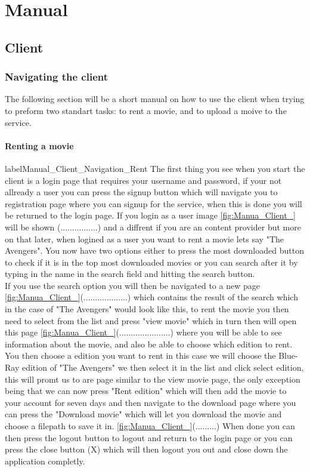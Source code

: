 \chapter{Manual}
\label{Manual}

\section{Client}
\label{Manual_Client}

\subsection{Navigating the client}
\label{Manual_Client_Navigation}
The following section will be a short manual on how to use the client when trying to preform two standart tasks: to rent a movie, and to upload a moive to the service.

\subsubsection{Renting a movie}
label{Manual_Client_Navigation_Rent}
The first thing you see when you start the client is a login page that requires your username and password, if your not allready a user you can press the signup button which will navigate you to registration page where you can signup for the service, when this is done you will be returned to the login page. If you login as a user image \ref{fig:Manua_Client_} will be shown (................) and a diffrent if you are an content provider but more on that later, when logined as a user you want to rent a movie lets say "The Avengers". You now have two options either to press the most downloaded button to check if it is in the top most downloaded movies or you can search after it by typing in the name in the search field and hitting the search button.
\\If you use the search option you will then be navigated to a new page \ref{fig:Manua_Client_}(...................) which contains the result of the search which in the case of "The Avengers" would look like this, to rent the movie you then need to select from the list and press "view movie" which in turn then will open this page \ref{fig:Manua_Client_}(......................) where you will be able to see information about the movie, and also be able to choose which edition to rent.
\\ You then choose a edition you want to rent in this case we will choose the Blue-Ray edition of "The Avengers" we then select it in the list and click select edition, this will promt us to are page similar to the view movie page, the only exception being that we can now press "Rent edition" which will then add the movie to your account for seven days and then navigate to the download page where you can press the "Download movie" which will let you download the movie and choose a filepath to save it in. \ref{fig:Manua_Client_}(.........) When done you can then press the logout button to logout and return to the login page or you can press the close button (X) which will then logout you out and close down the application completly.

